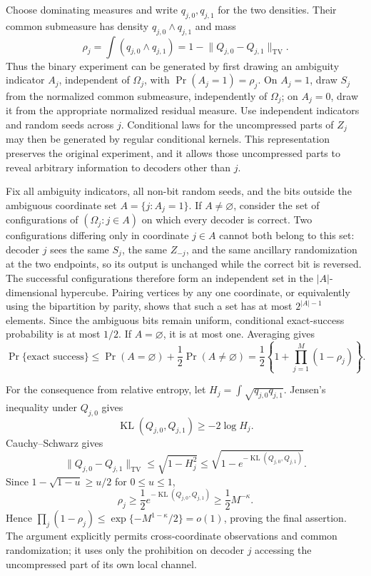 Choose dominating measures and write \(q_{j,0},q_{j,1}\) for the two densities.  Their common submeasure has density \(q_{j,0}\wedge q_{j,1}\) and mass
\[
\rho_j=\int(q_{j,0}\wedge q_{j,1})=1-\lVert Q_{j,0}-Q_{j,1}\rVert_{\mathrm{TV}}.
\]
Thus the binary experiment can be generated by first drawing an ambiguity indicator \(A_j\), independent of \(\Omega_j\), with \(\Pr(A_j=1)=\rho_j\).  On \(A_j=1\), draw \(S_j\) from the normalized common submeasure, independently of \(\Omega_j\); on \(A_j=0\), draw it from the appropriate normalized residual measure.  Use independent indicators and random seeds across \(j\).  Conditional laws for the uncompressed parts of \(Z_j\) may then be generated by regular conditional kernels.  This representation preserves the original experiment, and it allows those uncompressed parts to reveal arbitrary information to decoders other than \(j\).

Fix all ambiguity indicators, all non-bit random seeds, and the bits outside the ambiguous coordinate set \(A=\{j:A_j=1\}\).  If \(A\neq\varnothing\), consider the set of configurations of \((\Omega_j:j\in A)\) on which every decoder is correct.  Two configurations differing only in coordinate \(j\in A\) cannot both belong to this set: decoder \(j\) sees the same \(S_j\), the same \(Z_{-j}\), and the same ancillary randomization at the two endpoints, so its output is unchanged while the correct bit is reversed.  The successful configurations therefore form an independent set in the \(|A|\)-dimensional hypercube.  Pairing vertices by any one coordinate, or equivalently using the bipartition by parity, shows that such a set has at most \(2^{|A|-1}\) elements.  Since the ambiguous bits remain uniform, conditional exact-success probability is at most \(1/2\).  If \(A=\varnothing\), it is at most one.  Averaging gives
\[
\Pr\{\text{exact success}\}
\leq\Pr(A=\varnothing)+\frac12\Pr(A\neq\varnothing)
=\frac12\left\{1+\prod_{j=1}^M(1-\rho_j)\right\}.
\]

For the consequence from relative entropy, let \(H_j=\int\sqrt{q_{j,0}q_{j,1}}\).  Jensen's inequality under \(Q_{j,0}\) gives
\[
\operatorname{KL}(Q_{j,0},Q_{j,1})\geq-2\log H_j.
\]
Cauchy--Schwarz gives
\[
\lVert Q_{j,0}-Q_{j,1}\rVert_{\mathrm{TV}}
\leq\sqrt{1-H_j^2}
\leq\sqrt{1-e^{-\operatorname{KL}(Q_{j,0},Q_{j,1})}}.
\]
Since \(1-\sqrt{1-u}\geq u/2\) for \(0\leq u\leq1\),
\[
\rho_j\geq\frac12e^{-\operatorname{KL}(Q_{j,0},Q_{j,1})}
\geq\frac12M^{-\kappa}.
\]
Hence \(\prod_j(1-\rho_j)\leq\exp\{-M^{1-\kappa}/2\}=o(1)\), proving the final assertion.  The argument explicitly permits cross-coordinate observations and common randomization; it uses only the prohibition on decoder \(j\) accessing the uncompressed part of its own local channel.